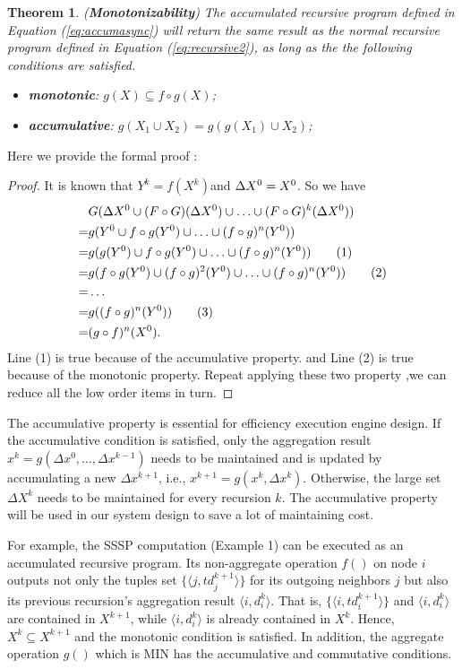 \documentclass{vldb}
\newtheorem{theorem}{Theorem}
\begin{document}
\begin{theorem}
	\label{th:monotone}
	(\textbf{Monotonizability}) The accumulated recursive program defined in Equation (\ref{eq:accumasync}) will return the same result as the normal recursive program defined in Equation (\ref{eq:recursive2}), as long as the the following conditions are satisfied.
	\begin{itemize}
		\item \textbf{monotonic}: $g(X)\subseteq f\circ g(X)$;
		\item \textbf{accumulative}: $g(X_1\cup X_2)=g(g(X_1)\cup X_2)$;
	\end{itemize}
\end{theorem}
Here we provide the formal proof :
 \begin{proof}
  It is known that $Y^k=f(X^k)$and $\Delta X^0=X^0\\$. So we have
 \begin{align}
 &G(\Delta X^0\cup (F\circ G)(\Delta X^0)\cup\ldots\cup (F\circ G)^k(\Delta X^0))\notag \\
 =&g(Y^0\cup f\circ g(Y^0)\cup \ldots \cup (f\circ g)^n(Y^0))    \notag\\
 =&g(g(Y^0)\cup f\circ g(Y^0)\cup \ldots \cup (f\circ g)^n(Y^0))  \tag{1}\\
 =&g(f\circ g(Y^0)\cup (f\circ g)^2(Y^0)\cup \ldots \cup (f\circ g)^n(Y^0)) \tag{2}\\
 =& \ldots \notag \\
 =&g((f\circ g)^n(Y^0))\tag{3}\\
 =&(g \circ f)^n(X^0).\notag
 \end{align}
  Line (1) is true because of the accumulative property. and Line (2) is true because of the monotonic property.
  Repeat applying these two property ,we can reduce all the low order items in turn.
 \end{proof}
 The accumulative property is essential for efficiency execution engine design. If the accumulative condition is satisfied, only the aggregation result $x^k=g(\Delta x^{0},\ldots,\Delta x^{k-1})$ needs to be maintained and is updated by accumulating a new $\Delta x^{k+1}$, i.e., $x^{k+1}=g(x^k,\Delta x^{k})$. Otherwise, the large set $\Delta X^{k}$ needs to be maintained for every recursion $k$. The accumulative property will be used in our system design to save a lot of maintaining cost.

For example, the SSSP computation (Example 1) can be executed as an accumulated recursive program. Its non-aggregate operation $f()$ on node $i$ outputs not only the tuples set $\{\langle j,td_j^{k+1}\rangle\}$ for its outgoing neighbors $j$ but also its previous recursion's aggregation result $\langle i,d_i^k\rangle$. That is, $\{\langle i,td_i^{k+1}\rangle\}$ and $\langle i,d_i^k\rangle$ are contained in $X^{k+1}$, while $\langle i,d_i^k\rangle$ is already contained in $X^{k}$. Hence, $X^{k}\subseteq X^{k+1}$ and the monotonic condition is satisfied. In addition, the aggregate operation $g()$ which is MIN has the accumulative and commutative conditions.
\end{document}
